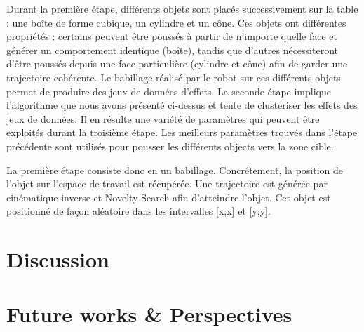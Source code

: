 \documentclass{llncs}
\begin{document}
Durant la première étape, différents objets sont placés successivement sur la table : une boîte de forme cubique, un cylindre et un cône. Ces objets ont différentes propriétés : certains peuvent être poussés à partir de n'importe quelle face et générer un comportement identique (boîte), tandis que d'autres nécessiteront d'être poussés depuis une face particulière (cylindre et cône) afin de garder une trajectoire cohérente. Le babillage réalisé par le robot sur ces différents objets permet de produire des jeux de données d'effets.
La seconde étape implique l'algorithme que nous avons présenté ci-dessus et tente de clusteriser les effets des jeux de données. Il en résulte une variété de paramètres qui peuvent être exploités durant la troisième étape.
Les meilleurs paramètres trouvés dans l'étape précédente sont utilisés pour pousser les différents objects vers la zone cible.

La première étape consiste donc en un babillage. Concrétement, la position de l'objet sur l'espace de travail est récupérée. Une trajectoire est générée par cinématique inverse et Novelty Search afin d'atteindre l'objet. Cet objet est positionné de façon aléatoire dans les intervalles [x;x] et [y;y].



\section{Discussion}

\section{Future works \& Perspectives}
\end{document}
